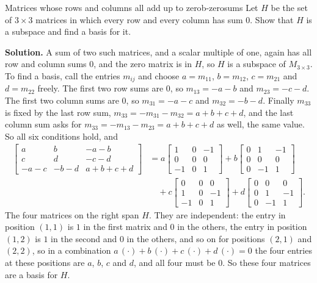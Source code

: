\documentclass[11pt]{article}
\begin{document}
\begin{exmp}{Matrices whose rows and columns all add up to zero}{b-zerosums}
Let $H$ be the set of $3\times3$ matrices in which every row and every column has sum $0$. Show that $H$ is a subspace and find a basis for it.

\textbf{Solution.} A sum of two such matrices, and a scalar multiple of one, again has all row and column sums $0$, and the zero matrix is in $H$, so $H$ is a subspace of $M_{3\times3}$. To find a basis, call the entries $m_{ij}$ and choose $a=m_{11}$, $b=m_{12}$, $c=m_{21}$ and $d=m_{22}$ freely. The first two row sums are $0$, so $m_{13}=-a-b$ and $m_{23}=-c-d$. The first two column sums are $0$, so $m_{31}=-a-c$ and $m_{32}=-b-d$. Finally $m_{33}$ is fixed by the last row sum, $m_{33}=-m_{31}-m_{32}=a+b+c+d$, and the last column sum asks for $m_{33}=-m_{13}-m_{23}=a+b+c+d$ as well, the same value. So all six conditions hold, and
\begin{align*}
\begin{bmatrix}a&b&-a-b\\c&d&-c-d\\-a-c&-b-d&a+b+c+d\end{bmatrix}
&=a\begin{bmatrix}1&0&-1\\0&0&0\\-1&0&1\end{bmatrix}
+b\begin{bmatrix}0&1&-1\\0&0&0\\0&-1&1\end{bmatrix}\\
&\quad+c\begin{bmatrix}0&0&0\\1&0&-1\\-1&0&1\end{bmatrix}
+d\begin{bmatrix}0&0&0\\0&1&-1\\0&-1&1\end{bmatrix}.
\end{align*}
The four matrices on the right span $H$. They are independent: the entry in position $(1,1)$ is $1$ in the first matrix and $0$ in the others, the entry in position $(1,2)$ is $1$ in the second and $0$ in the others, and so on for positions $(2,1)$ and $(2,2)$, so in a combination $a\,(\cdot)+b\,(\cdot)+c\,(\cdot)+d\,(\cdot)=0$ the four entries at these positions are $a$, $b$, $c$ and $d$, and all four must be $0$. So these four matrices are a basis for $H$.
\end{exmp}
\end{document}
